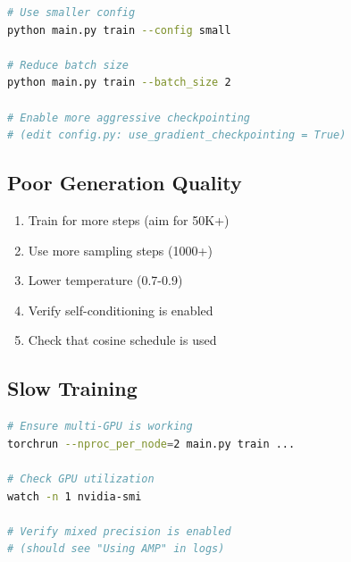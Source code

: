 \documentclass[11pt,a4paper]{article}
\begin{document}
\begin{lstlisting}[language=bash]
# Use smaller config
python main.py train --config small

# Reduce batch size
python main.py train --batch_size 2

# Enable more aggressive checkpointing
# (edit config.py: use_gradient_checkpointing = True)
\end{lstlisting}

\subsection{Poor Generation Quality}

\begin{enumerate}
    \item Train for more steps (aim for 50K+)
    \item Use more sampling steps (1000+)
    \item Lower temperature (0.7-0.9)
    \item Verify self-conditioning is enabled
    \item Check that cosine schedule is used
\end{enumerate}

\subsection{Slow Training}

\begin{lstlisting}[language=bash]
# Ensure multi-GPU is working
torchrun --nproc_per_node=2 main.py train ...

# Check GPU utilization
watch -n 1 nvidia-smi

# Verify mixed precision is enabled
# (should see "Using AMP" in logs)
\end{lstlisting}
\end{document}
